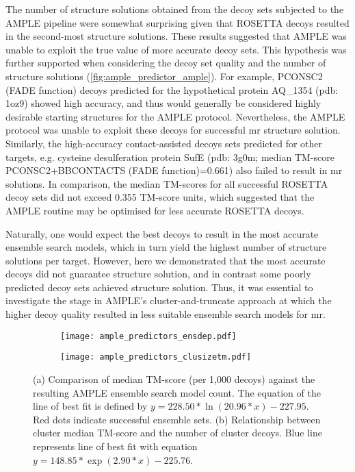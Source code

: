 The number of structure solutions obtained from the decoy sets subjected to the AMPLE pipeline were somewhat surprising given that ROSETTA decoys resulted in the second-most structure solutions. These results suggested that AMPLE was unable to exploit the true value of more accurate decoy sets. This hypothesis was further supported when considering the decoy set quality and the number of structure solutions (\cref{fig:ample_predictor_ample}). For example, PCONSC2 (FADE function) decoys predicted for the hypothetical protein AQ\_1354 (\gls{pdb}: 1oz9) showed high accuracy, and thus would generally be considered highly desirable starting structures for the AMPLE protocol. Nevertheless, the AMPLE protocol was unable to exploit these decoys for successful \gls{mr} structure solution. Similarly, the high-accuracy contact-assisted decoys sets predicted for other targets, e.g. cysteine desulferation protein SufE (\gls{pdb}: 3g0m; median TM-score PCONSC2+BBCONTACTS (FADE function)=0.661) also failed to result in \gls{mr} solutions. In comparison, the median TM-scores for all successful ROSETTA decoy sets did not exceed 0.355 TM-score units, which suggested that the AMPLE routine may be optimised for less accurate ROSETTA decoys.

Naturally, one would expect the best decoys to result in the most accurate ensemble search models, which in turn yield the highest number of structure solutions per target. However, here we demonstrated that the most accurate decoys did not guarantee structure solution, and in contrast some poorly predicted decoy sets achieved structure solution. Thus, it was essential to investigate the stage in AMPLE's cluster-and-truncate approach at which the higher decoy quality resulted in less suitable ensemble search models for \gls{mr}.

\begin{figure}[H]
    \centering
    \begin{subfigure}[b]{0.49\textwidth}
        \centering
        \texttt{[image: ample\_predictors\_ensdep.pdf]}
        \caption{}
        \label{fig:ample_predictor_ensdep}
    \end{subfigure}
    \begin{subfigure}[b]{0.49\textwidth}
        \centering
        \texttt{[image: ample\_predictors\_clusizetm.pdf]}
        \caption{}
        \label{fig:ample_predictor_clusizetm}
    \end{subfigure}

    \caption[Relationship between TM-score, AMPLE search model size and SPICKER cluster count]{(a) Comparison of median TM-score (per 1,000 decoys) against the resulting AMPLE ensemble search model count. The equation of the line of best fit is defined by $y=228.50*\ln\left(20.96*x\right)-227.95$. Red dots indicate successful ensemble sets. (b) Relationship between cluster median TM-score and the number of cluster decoys. Blue line represents line of best fit with equation $y=148.85*\exp\left(2.90*x\right)-225.76$.}
\end{figure}


